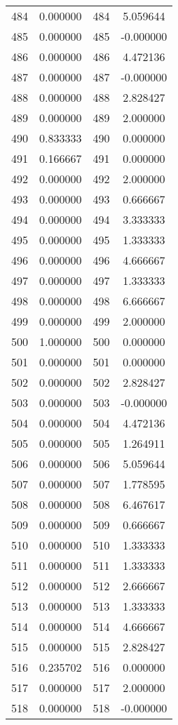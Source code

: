 \documentclass[12pt]{article}
\begin{document}
\begin{longtable}{@{}cccc@{}}
484 & 0.000000 & 484 & 5.059644 \\
485 & 0.000000 & 485 & -0.000000 \\
486 & 0.000000 & 486 & 4.472136 \\
487 & 0.000000 & 487 & -0.000000 \\
488 & 0.000000 & 488 & 2.828427 \\
489 & 0.000000 & 489 & 2.000000 \\
490 & 0.833333 & 490 & 0.000000 \\
491 & 0.166667 & 491 & 0.000000 \\
492 & 0.000000 & 492 & 2.000000 \\
493 & 0.000000 & 493 & 0.666667 \\
494 & 0.000000 & 494 & 3.333333 \\
495 & 0.000000 & 495 & 1.333333 \\
496 & 0.000000 & 496 & 4.666667 \\
497 & 0.000000 & 497 & 1.333333 \\
498 & 0.000000 & 498 & 6.666667 \\
499 & 0.000000 & 499 & 2.000000 \\
500 & 1.000000 & 500 & 0.000000 \\
501 & 0.000000 & 501 & 0.000000 \\
502 & 0.000000 & 502 & 2.828427 \\
503 & 0.000000 & 503 & -0.000000 \\
504 & 0.000000 & 504 & 4.472136 \\
505 & 0.000000 & 505 & 1.264911 \\
506 & 0.000000 & 506 & 5.059644 \\
507 & 0.000000 & 507 & 1.778595 \\
508 & 0.000000 & 508 & 6.467617 \\
509 & 0.000000 & 509 & 0.666667 \\
510 & 0.000000 & 510 & 1.333333 \\
511 & 0.000000 & 511 & 1.333333 \\
512 & 0.000000 & 512 & 2.666667 \\
513 & 0.000000 & 513 & 1.333333 \\
514 & 0.000000 & 514 & 4.666667 \\
515 & 0.000000 & 515 & 2.828427 \\
516 & 0.235702 & 516 & 0.000000 \\
517 & 0.000000 & 517 & 2.000000 \\
518 & 0.000000 & 518 & -0.000000 \\

\end{longtable}
\end{document}
